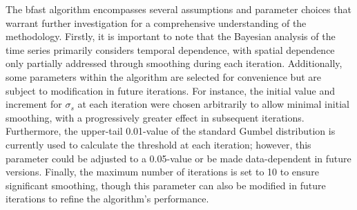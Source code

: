 The \gls{bfast} algorithm encompasses several assumptions and parameter 
choices that warrant further investigation for a comprehensive understanding 
of the methodology. Firstly, it is important to note that the Bayesian analysis 
of the time series primarily considers temporal dependence, with spatial 
dependence only partially addressed through smoothing during each iteration. 
Additionally, some parameters within the algorithm are selected for convenience 
but are subject to modification in future iterations. For instance, the 
initial value and increment for $\sigma_s$ at each iteration were chosen 
arbitrarily to allow minimal initial smoothing, with a progressively greater 
effect in subsequent iterations. Furthermore, the upper-tail 0.01-value of 
the standard Gumbel distribution is currently used to calculate the threshold 
at each iteration; however, this parameter could be adjusted to a 0.05-value 
or be made data-dependent in future versions. Finally, the maximum number of 
iterations is set to 10 to ensure significant smoothing, though this parameter 
can also be modified in future iterations to refine the algorithm's performance.